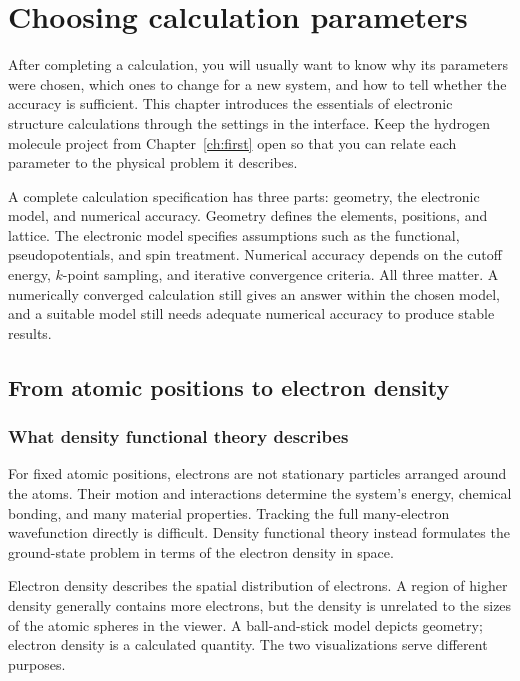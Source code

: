 \chapter{Choosing calculation parameters}\label{ch:theory}

After completing a calculation, you will usually want to know why its parameters were chosen, which ones to change for a new system, and how to tell whether the accuracy is sufficient. This chapter introduces the essentials of electronic structure calculations through the settings in the interface. Keep the hydrogen molecule project from Chapter~\ref{ch:first} open so that you can relate each parameter to the physical problem it describes.

A complete calculation specification has three parts: geometry, the electronic model, and numerical accuracy. Geometry defines the elements, positions, and lattice. The electronic model specifies assumptions such as the functional, pseudopotentials, and spin treatment. Numerical accuracy depends on the cutoff energy, $k$-point sampling, and iterative convergence criteria. All three matter. A numerically converged calculation still gives an answer within the chosen model, and a suitable model still needs adequate numerical accuracy to produce stable results.

\section{From atomic positions to electron density}

\subsection{What density functional theory describes}

For fixed atomic positions, electrons are not stationary particles arranged around the atoms. Their motion and interactions determine the system's energy, chemical bonding, and many material properties. Tracking the full many-electron wavefunction directly is difficult. Density functional theory instead formulates the ground-state problem in terms of the electron density in space.

Electron density describes the spatial distribution of electrons. A region of higher density generally contains more electrons, but the density is unrelated to the sizes of the atomic spheres in the viewer. A ball-and-stick model depicts geometry; electron density is a calculated quantity. The two visualizations serve different purposes.


